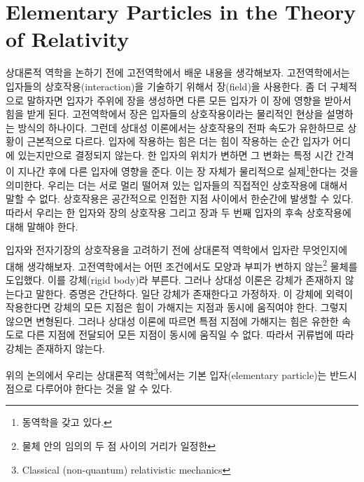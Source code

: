 \section{Elementary Particles in the Theory of Relativity}
\label{sec:05a-01a}

상대론적 역학을 논하기 전에 고전역학에서 배운 내용을 생각해보자. 고전역학에서는 입자들의 상호작용(interaction)을 기술하기 위해서 장(field)을 사용한다. 좀 더 구체적으로 말하자면 입자가 주위에 장을 생성하면 다른 모든 입자가 이 장에 영향을 받아서 힘을 받게 된다. 고전역학에서 장은 입자들의 상호작용이라는 물리적인 현상을 설명하는 방식의 하나이다.
그런데 상대성 이론에서는 상호작용의 전파 속도가 유한하므로 상황이 근본적으로 다르다. 입자에 작용하는 힘은 더는 힘이 작용하는 순간 입자가 어디에 있는지만으로 결정되지 않는다. 한 입자의 위치가 변하면 그 변화는 특정 시간 간격이 지나간 후에 다른 입자에 영향을 준다. 이는 장 자체가 물리적으로 실제\footnote{동역학을 갖고 있다.}한다는 것을 의미한다. 우리는 더는 서로 멀리 떨어져 있는 입자들의 직접적인 상호작용에 대해서 말할 수 없다. 상호작용은 공간적으로 인접한 지점 사이에서 한순간에 발생할 수 있다. 따라서 우리는 한 입자와 장의 상호작용 그리고 장과 두 번째 입자의 후속 상호작용에 대해 말해야 한다.

입자와 전자기장의 상호작용을 고려하기 전에 상대론적 역학에서 입자란 무엇인지에 대해 생각해보자.
고전역학에서는 어떤 조건에서도 모양과 부피가 변하지 않는\footnote{물체 안의 임의의 두 점 사이의 거리가 일정한} 물체를 도입했다. 이를 강체(rigid body)라 부른다. 그러나 상대성 이론은 강체가 존재하지 않는다고 말한다. 증명은 간단하다. 일단 강체가 존재한다고 가정하자. 이 강체에 외력이 작용한다면 강체의 모든 지점은 힘이 가해지는 지점과 동시에 움직여야 한다. 그렇지 않으면 변형된다. 그러나 상대성 이론에 따르면 특점 지점에 가해지는 힘은 유한한 속도로 다른 지점에 전달되어 모든 지점이 동시에 움직일 수 없다. 따라서 귀류법에 따라 강체는 존재하지 않는다.

위의 논의에서 우리는 상대론적 역학\footnote{Classical (non-quantum) relativistic mechanics}에서는 기본 입자(elementary particle)는 반드시 점으로 다루어야 한다는 것을 알 수 있다.
